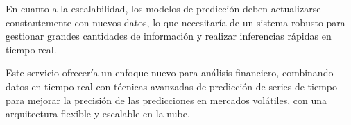 
En cuanto a la escalabilidad, los modelos de predicción deben actualizarse constantemente con nuevos datos, lo que necesitaría de un sistema robusto para gestionar grandes cantidades de información y realizar inferencias rápidas en tiempo real.

Este servicio ofrecería un enfoque nuevo para análisis financiero, combinando datos en tiempo real con técnicas avanzadas de predicción de series de tiempo para mejorar la precisión de las predicciones en mercados volátiles, con una arquitectura flexible y escalable en la nube. 